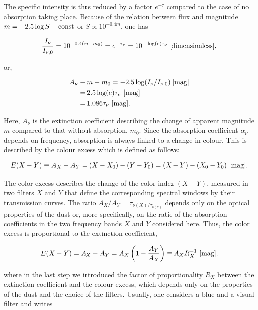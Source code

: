 \documentclass[a4paper,11pt]{article}
\begin{document}
{\noindent}The specific intensity is thus reduced by a factor $e^{-\tau}$ compared to the case of no absorption taking place. Because of the relation between flux and magnitude $m=-2.5\log S+{\rm const}$ or $S\propto 10^{-0.4m}$, one has

\begin{align*}
    \frac{I_\nu}{I_{\nu,0}} = 10^{-0.4(m-m_0)} = e^{-\tau_\nu} = 10^{-\log(e)\tau_\nu} ~ [{\rm dimensionless}],
\end{align*}

{\noindent}or,

\begin{align*}
    A_\nu &\equiv m-m_0 = -2.5\log(I_\nu/I_{\nu,0}) ~ [{\rm mag}] \\
          &= 2.5\log(e)\tau_\nu ~ [{\rm mag}] \\
          &= 1.086\tau_\nu ~ [{\rm mag}].
\end{align*}

{\noindent}Here, $A_\nu$ is the extinction coefficient describing the change of apparent magnitude $m$ compared to that without absorption, $m_0$. Since the absorption coefficient $\alpha_\nu$ depends on frequency, absorption is always linked to a change in colour. This is described by the colour excess which is defined as follows:

\begin{align*}
    E(X-Y) \equiv A_X-A_Y = (X-X_0)-(Y-Y_0) = (X-Y)-(X_0-Y_0) ~ [{\rm mag}].
\end{align*}

{\noindent}The color excess describes the change of the color index $(X-Y)$, measured in two filters $X$ and $Y$ that define the corresponding spectral windows by their transmission curves. The ratio $A_X/A_Y=\tau_{\nu(X)/\tau_{\nu(Y)}}$ depends only on the optical properties of the dust or, more specifically, on the ratio of the absorption coefficients in the two frequency bands $X$ and $Y$ considered here. Thus, the color excess is proportional to the extinction coefficient,

\begin{align*}
    E(X-Y) = A_X-A_Y = A_X\left(1-\frac{A_Y}{A_X}\right) \equiv A_XR_X^{-1} ~ [{\rm mag}].
\end{align*}

{\noindent}where in the last step we introduced the factor of proportionality $R_X$ between the extinction coefficient and the colour excess, which depends only on the properties of the dust and the choice of the filters. Usually, one considers a blue and a visual filter and writes
\end{document}
